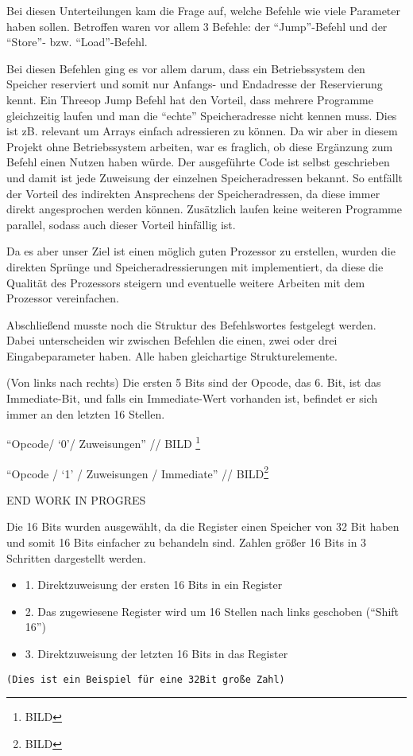 \documentclass[paper=a4,fontsize=12pt,twocolumn]{scrreprt}
\begin{document}
Bei diesen Unterteilungen kam die Frage auf, welche Befehle wie viele Parameter haben sollen.
Betroffen waren vor allem 3 Befehle: der \enquote{Jump}-Befehl und der \enquote{Store}- bzw. \enquote{Load}-Befehl.

Bei diesen Befehlen ging es vor allem darum, dass ein Betriebssystem den Speicher reserviert und somit nur Anfangs- und Endadresse der Reservierung kennt.
Ein Threeop Jump Befehl hat den Vorteil, dass mehrere Programme gleichzeitig laufen und man die \enquote{echte} Speicheradresse nicht kennen muss.
Dies ist zB. relevant um Arrays einfach adressieren zu können.
Da wir aber in diesem Projekt ohne Betriebssystem arbeiten, war es fraglich, ob diese Ergänzung zum Befehl einen Nutzen haben würde.
Der ausgeführte Code ist selbst geschrieben und damit ist jede Zuweisung der einzelnen Speicheradressen bekannt.
So entfällt der Vorteil des indirekten Ansprechens der Speicheradressen, da diese immer direkt angesprochen werden können.
Zusätzlich laufen keine weiteren Programme parallel, sodass auch dieser Vorteil hinfällig ist.

Da es aber unser Ziel ist einen möglich guten Prozessor zu erstellen, wurden die direkten Sprünge und Speicheradressierungen mit implementiert, da diese die Qualität des Prozessors steigern und eventuelle weitere Arbeiten mit dem Prozessor vereinfachen.

Abschließend musste noch die Struktur des Befehlswortes festgelegt werden. Dabei unterscheiden wir zwischen Befehlen die einen, zwei oder drei Eingabeparameter haben.
Alle haben gleichartige Strukturelemente.

(Von links nach rechts) Die ersten 5 Bits sind der Opcode, das 6. Bit, ist das Immediate-Bit, und falls ein Immediate-Wert vorhanden ist, befindet er sich immer an den letzten 16 Stellen.

\enquote{Opcode/ \enquote{0}/ Zuweisungen}  // BILD \footnote{BILD}

\enquote{Opcode / \enquote{1} / Zuweisungen / Immediate} // BILD\footnote{BILD}

{\color{green}END WORK IN PROGRES}

{\color{red}
Die 16 Bits wurden ausgewählt, da die Register einen Speicher von 32 Bit haben und somit 16 Bits einfacher zu behandeln sind. Zahlen größer 16 Bits in 3 Schritten dargestellt werden. 
\begin{itemize}
    \item 1. Direktzuweisung der ersten 16 Bits in ein Register
    \item 2. Das zugewiesene Register wird um 16 Stellen nach links geschoben (\enquote{Shift 16})
    \item 3. Direktzuweisung der letzten 16 Bits in das Register
\end{itemize}
    \texttt{(Dies ist ein Beispiel für eine 32Bit große Zahl)}
}
\end{document}
